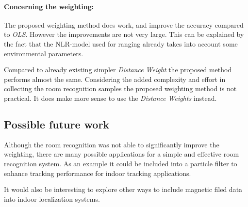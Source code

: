\paragraph{Concerning the weighting:} 

The proposed weighting method does work, and improve the accuracy compared to \emph{OLS}. However the improvements are not very large. This can be explained by the fact that the NLR-model used for ranging already takes into account some environmental parameters.

Compared to already existing simpler \emph{Distance Weight} the proposed method performs almost the same. Considering the added complexity and effort in collecting the room recognition samples the proposed weighting method is not practical. It does make more sense to use the \emph{Distance Weights} instead.



\subsection{Possible future work}

Although the room recognition was not able to significantly improve the weighting, there are many possible applications for a simple and effective room recognition system. As an example it could be included into a particle filter to enhance tracking performance for indoor tracking applications.

It would also be interesting to explore other ways to include magnetic filed data into indoor localization systems.